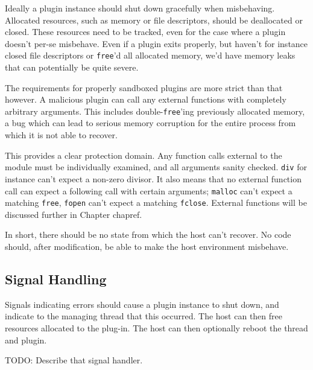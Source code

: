 Ideally a plugin instance should shut down gracefully when misbehaving.
Allocated resources, such as memory or file descriptors, should be deallocated
or closed. These resources need to be tracked, even for the case where a plugin
doesn't per-se misbehave. Even if a plugin exits properly, but haven't for
instance closed file descriptors or \texttt{free}'d all allocated memory, we'd
have memory leaks that can potentially be quite severe.

The requirements for properly sandboxed plugins are more strict than that
however. A malicious plugin can call any external functions with completely
arbitrary arguments. This includes double-\texttt{free}'ing previously
allocated memory, a bug which can lead to serious memory corruption for the
entire process from which it is not able to recover.

This provides a clear protection domain. Any function calls external to the
module must be individually examined, and all arguments sanity checked.
\texttt{div} for instance can't expect a non-zero divisor. It also means that
no external function call can expect a following call with certain arguments;
\texttt{malloc} can't expect a matching \texttt{free}, \texttt{fopen} can't
expect a matching \texttt{fclose}. External functions will be discussed further
in Chapter {chapref}. 

In short, there should be no state from which the host can't recover. No code
should, after modification, be able to make the host environment misbehave.

\subsection {Signal Handling}

Signals indicating errors should cause a plugin instance to shut down, and
indicate to the managing thread that this occurred. The host can then free
resources allocated to the plug-in. The host can then optionally reboot the
thread and plugin.

TODO: Describe that signal handler.
